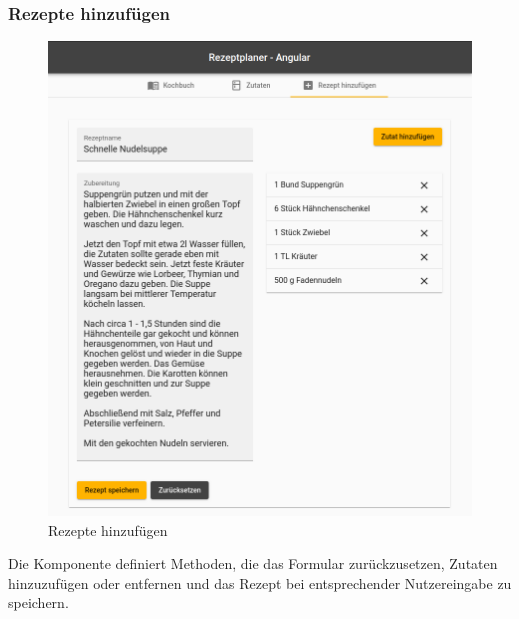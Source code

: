 \subsubsection{Rezepte hinzufügen}
\begin{figure}
  \centering
  \includegraphics[scale=0.5]{Grafiken/03_Implementation/Hinzufuegen_Angular.png}
  \caption{Rezepte hinzufügen}
  \label{fig:hinzufuegen_angular}
\end{figure}

Die Komponente definiert Methoden, die das Formular zurückzusetzen, Zutaten hinzuzufügen oder entfernen und das Rezept bei entsprechender Nutzereingabe zu speichern.

